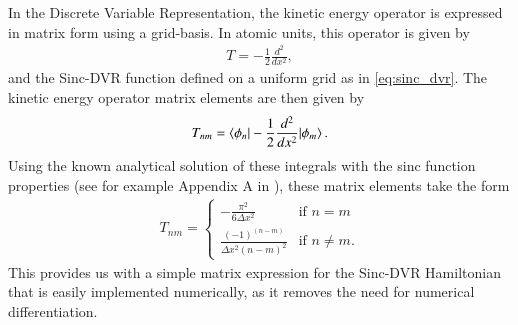 \documentclass{subfiles}
\begin{document}
In the Discrete Variable Representation, the kinetic energy operator is expressed in matrix form using a grid-basis. In atomic units, this operator is given by
\begin{align*}
    T = -\frac{1}{2} \frac{d^2}{dx^2} ,
\end{align*}
and the Sinc-DVR function defined on a uniform grid as in \eqref{eq:sinc_dvr}. The kinetic energy operator matrix elements are then given by
\begin{align*}
    T_{nm} = \braket{\phi_n|-\frac{1}{2} \frac{d^2}{dx^2}|\phi_m}.
\end{align*}
Using the known analytical solution of these integrals with the sinc function properties (see for example Appendix A in \cite{colbert1992novel}), these matrix elements take the form 
\begin{align}
    T_{nm} = \begin{cases}
        -\frac{\pi^2}{6\Delta x^2} & \text{if } n = m \\
        \frac{(-1)^(n-m)}{\Delta x^2(n - m)^2} & \text{if } n \neq m.
    \end{cases}\label{eq:sinc_dvr_kinetic}
\end{align}
This provides us with a simple matrix expression for the Sinc-DVR Hamiltonian that is easily implemented numerically, as it removes the need for numerical differentiation.
\end{document}
